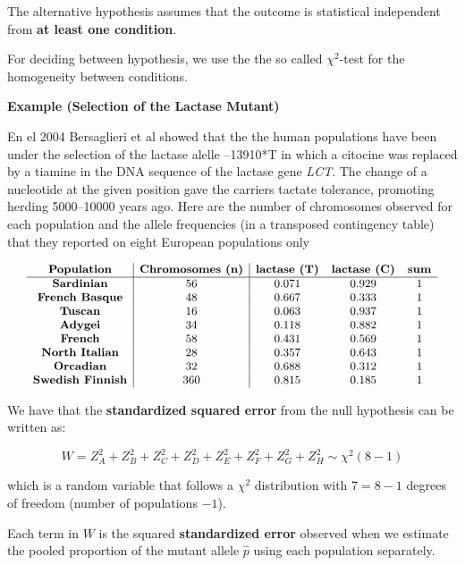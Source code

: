 \documentclass[
]{book}
\begin{document}
The alternative hypothesis assumes that the outcome is statistical independent from \textbf{at least one condition}.

For deciding between hypothesis, we use the the so called \(\chi^2\)-test for the homogeneity between conditions.

\textbf{Example (Selection of the Lactase Mutant)}

En el 2004 Bersaglieri et al \citep{bersaglieri2004genetic} showed that the the human populations have been under the selection of the lactase alelle --13910*T in which a citocine was replaced by a tiamine in the DNA sequence of the lactase gene \emph{LCT}. The change of a nucleotide at the given position gave the carriers tactate tolerance, promoting herding 5000--10000 years ago. Here are the number of chromosomes observed for each population and the allele frequencies (in a transposed contingency table) that they reported on eight European populations only

\[
\small
\begin{array}{c|c|ccc}
\textbf{Population} & \textbf{Chromosomes (n)} & \textbf{lactase (T)} & \textbf{lactase (C)} & \textbf{sum} \\
\hline
\textbf{Sardinian} & 56 & 0.071 & 0.929 & 1 \\
\textbf{French Basque} & 48 & 0.667 & 0.333 & 1 \\
\textbf{Tuscan} & 16 & 0.063 & 0.937 & 1 \\
\textbf{Adygei} & 34 & 0.118 & 0.882 & 1 \\
\textbf{French} & 58 & 0.431 & 0.569 & 1 \\
\textbf{North Italian} & 28 & 0.357 & 0.643 & 1 \\
\textbf{Orcadian} & 32 & 0.688 & 0.312 & 1 \\
\textbf{Swedish Finnish} & 360 & 0.815 & 0.185 & 1 \\
\end{array}
\]

We have that the \textbf{standardized squared error} from the null hypothesis can be written as:

\[W= Z_A^2+Z_B^2+Z_C^2+Z_D^2+Z_E^2+Z_F^2+Z_G^2+Z_H^2\sim \chi^2(8-1)\]

which is a random variable that follows a \(\chi^2\) distribution with \(7=8-1\) degrees of freedom (number of populations \(-1\)).

Each term in \(W\) is the squared \textbf{standardized error} observed when we estimate the pooled proportion of the mutant allele \(\hat{p}\) using each population separately.
\end{document}
